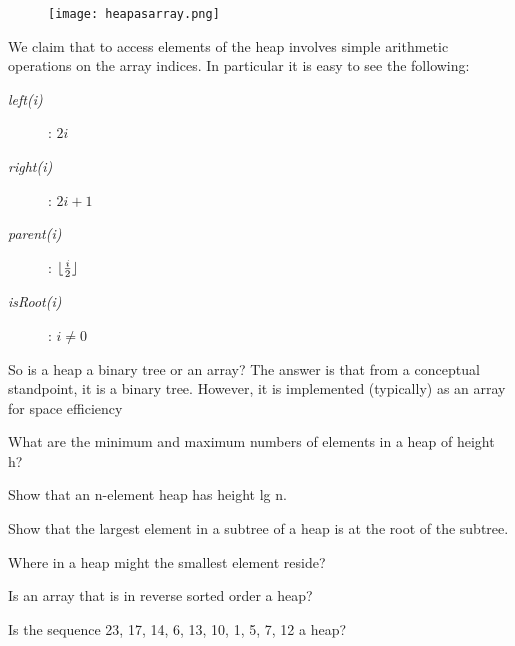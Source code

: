 \begin{figure}
\label{fig:heapasarray}
		\texttt{[image: heapasarray.png]}
\end{figure}
We claim that to access elements of the heap involves simple arithmetic operations on the array indices.
In particular it is easy to see the following:
\begin{description}
\item[\textit{left(i)}]: $2i$
\item[\textit{right(i)}]: $2i+1$
\item[\textit{parent(i)}]: $\lfloor\frac{i}{2}\rfloor$
\item[\textit{isRoot(i)}]: $i \neq 0$
\end{description}

So is a heap a binary tree or an array? The answer is that from a conceptual standpoint, it is a binary
tree. However, it is implemented (typically) as an array for space efficiency

\begin{problem}
What are the minimum and maximum numbers of elements in a heap of height h?
\end{problem}

\begin{problem}
Show that an n-element heap has height lg n.
\end{problem}

\begin{problem}

Show that the largest element in a subtree of a heap is at the root of the subtree.
\end{problem}

\begin{problem}

Where in a heap might the smallest element reside?
\end{problem}

\begin{problem}

Is an array that is in reverse sorted order a heap?

\end{problem}

\begin{problem}

Is the sequence 23, 17, 14, 6, 13, 10, 1, 5, 7, 12 a heap?
\end{problem}

